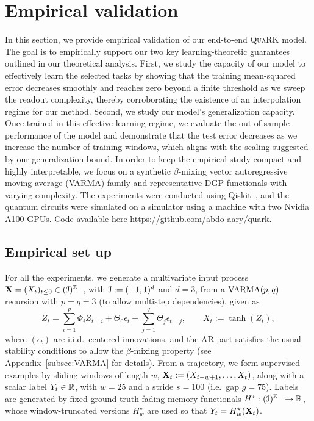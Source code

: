 \section{Empirical validation}\label{sec:experiments}
In this section, we provide empirical validation of our end-to-end \textsc{QuaRK} model. The goal is to empirically support our two key learning-theoretic guarantees outlined in our theoretical analysis. First, we study the capacity of our model to effectively learn the selected tasks by showing that the training mean-squared error decreases smoothly and reaches zero beyond a finite threshold as we sweep the readout complexity, thereby corroborating the existence of an interpolation regime for our method. Second, we study our model's generalization capacity. Once trained in this effective-learning regime, we evaluate the out-of-sample performance of the model and demonstrate that the test error decreases as we increase the number of training windows, which aligns with the scaling suggested by our generalization bound. In order to keep the empirical study compact and highly interpretable, we focus on a synthetic $\beta$-mixing vector autoregressive moving average (VARMA) family and representative DGP functionals with varying complexity. The experiments were conducted using Qiskit~\cite{javadi2024quantum}, and the quantum circuits were simulated on a simulator using a machine with two Nvidia A100 GPUs. Code available here \href{https://github.com/abdo-aary/quark}{https://github.com/abdo-aary/quark}.

\subsection{Empirical set up}
For all the experiments, we generate a multivariate input process ${\mathbf{X}} = (X_t)_{t \leq 0} \in ({\mathcal{I}})^{{\mathbb{Z}}_-}$, with ${\mathcal{I}} := (-1,1)^d$ and $d=3$, from a $\operatorname{VARMA}(p,q)$ recursion with $p = q = 3$ (to allow multistep dependencies), given as
\begin{equation}
    Z_t=\sum_{i=1}^p\Phi_i Z_{t-i}+\Theta_0\epsilon_t+\sum_{j=1}^q \Theta_j \epsilon_{t-j}, \qquad X_t := \tanh(Z_t),
\end{equation}
where $(\epsilon_t)$ are i.i.d.\ centered innovations, and the AR part satisfies the usual stability conditions to allow the $\beta$-mixing property (see Appendix~\ref{subsec:VARMA} for details). From a trajectory, we form supervised examples by sliding windows of length $w$, ${\mathbf{X}}_t := (X_{t-w+1}, \ldots, X_t)$, along with a scalar label $Y_t \in {\mathbb{R}}$, with $w = 25$ and a stride $s = 100$ (i.e.\ gap $g = 75$). Labels are generated by fixed ground-truth fading-memory functionals $H^\star: ({\mathcal{I}})^{{\mathbb{Z}}_-} \to {\mathbb{R}}$, whose window-truncated versions $H^\star_w$ are used so that $Y_t = H^\star_w ({\mathbf{X}}_t)$.

